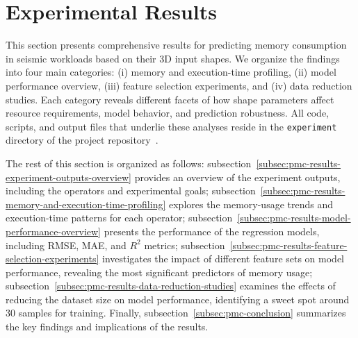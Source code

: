 \section{Experimental Results}
\label{sec:pmc-results}

This section presents comprehensive results for predicting memory consumption in seismic workloads based on their \ac{3D} input shapes.
We organize the findings into four main categories:
(i) memory and execution-time profiling,
(ii) model performance overview,
(iii) feature selection experiments,
and (iv) data reduction studies.
Each category reveals different facets of how shape parameters affect resource requirements, model behavior, and prediction robustness.
All code, scripts, and output files that underlie these analyses reside in the \texttt{experiment} directory of the project repository~\cite{delucca2025experiment2results}.

The rest of this section is organized as follows: subsection~\ref{subsec:pmc-results-experiment-outputs-overview} provides an overview of the experiment outputs, including the operators and experimental goals;
subsection~\ref{subsec:pmc-results-memory-and-execution-time-profiling} explores the memory-usage trends and execution-time patterns for each operator;
subsection~\ref{subsec:pmc-results-model-performance-overview} presents the performance of the regression models, including \ac{RMSE}, \ac{MAE}, and $R^2$ metrics;
subsection~\ref{subsec:pmc-results-feature-selection-experiments} investigates the impact of different feature sets on model performance, revealing the most significant predictors of memory usage;
subsection~\ref{subsec:pmc-results-data-reduction-studies} examines the effects of reducing the dataset size on model performance, identifying a sweet spot around 30 samples for training.
Finally, subsection~\ref{subsec:pmc-conclusion} summarizes the key findings and implications of the results.





